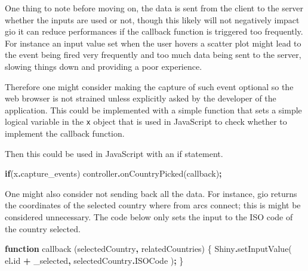\documentclass[
]{krantz}
\makeatletter
\newenvironment{Shaded}{\begin{snugshade}}{\end{snugshade}}
\newcommand{\AttributeTok}[1]{\textcolor[rgb]{0.61,0.61,0.61}{#1}}
\newcommand{\CommentTok}[1]{\textcolor[rgb]{0.37,0.37,0.37}{\textit{#1}}}
\newcommand{\ControlFlowTok}[1]{\textcolor[rgb]{0.27,0.27,0.27}{\textbf{#1}}}
\newcommand{\FunctionTok}[1]{\textcolor[rgb]{0,0,0}{#1}}
\newcommand{\KeywordTok}[1]{\textcolor[rgb]{0.27,0.27,0.27}{\textbf{#1}}}
\newcommand{\NormalTok}[1]{#1}
\newcommand{\OperatorTok}[1]{\textcolor[rgb]{0.43,0.43,0.43}{\textbf{#1}}}
\newcommand{\OtherTok}[1]{\textcolor[rgb]{0.37,0.37,0.37}{#1}}
\newcommand{\StringTok}[1]{\textcolor[rgb]{0.5,0.5,0.5}{#1}}
\newenvironment{kframe}{%
\medskip{}
\setlength{\fboxsep}{.8em}
 \def\at@end@of@kframe{}%
 \ifinner\ifhmode%
  \def\at@end@of@kframe{\end{minipage}}%
  \begin{minipage}{\columnwidth}%
 \fi\fi%
 \def\FrameCommand##1{\hskip\@totalleftmargin \hskip-\fboxsep
 \colorbox{shadecolor}{##1}\hskip-\fboxsep
     \hskip-\linewidth \hskip-\@totalleftmargin \hskip\columnwidth}%
 \MakeFramed {\advance\hsize-\width
   \@totalleftmargin\z@ \linewidth\hsize
   \@setminipage}}%
 {\par\unskip\endMakeFramed%
 \at@end@of@kframe}
\renewenvironment{Shaded}{\begin{kframe}}{\end{kframe}}
\makeatother
\begin{document}
One thing to note before moving on, the data is sent from the client to the server whether the inputs are used or not, though this likely will not negatively impact gio it can reduce performances if the callback function is triggered too frequently. For instance an input value set when the user hovers a scatter plot might lead to the event being fired very frequently and too much data being sent to the server, slowing things down and providing a poor experience.

Therefore one might consider making the capture of such event optional so the web browser is not strained unless explicitly asked by the developer of the application. This could be implemented with a simple function that sets a simple logical variable in the \texttt{x} object that is used in JavaScript to check whether to implement the callback function.

\begin{Shaded}
\end{Shaded}

Then this could be used in JavaScript with an if statement.

\begin{Shaded}
\begin{Highlighting}[]
\ControlFlowTok{if}\NormalTok{(x}\OperatorTok{.}\AttributeTok{capture\_events}\NormalTok{)}
\NormalTok{  controller}\OperatorTok{.}\FunctionTok{onCountryPicked}\NormalTok{(callback)}\OperatorTok{;}
\end{Highlighting}
\end{Shaded}

One might also consider not sending back all the data. For instance, gio returns the coordinates of the selected country where from arcs connect; this is might be considered unnecessary. The code below only sets the input to the ISO code of the country selected.

\begin{Shaded}
\begin{Highlighting}[]
\KeywordTok{function} \FunctionTok{callback}\NormalTok{ (selectedCountry}\OperatorTok{,}\NormalTok{ relatedCountries) \{}
\NormalTok{  Shiny}\OperatorTok{.}\FunctionTok{setInputValue}\NormalTok{(}
\NormalTok{    el}\OperatorTok{.}\AttributeTok{id} \OperatorTok{+} \StringTok{\textquotesingle{}\_selected\textquotesingle{}}\OperatorTok{,} 
\NormalTok{    selectedCountry}\OperatorTok{.}\AttributeTok{ISOCode}
\NormalTok{  )}\OperatorTok{;}
\NormalTok{\}}
\end{Highlighting}
\end{Shaded}
\end{document}
